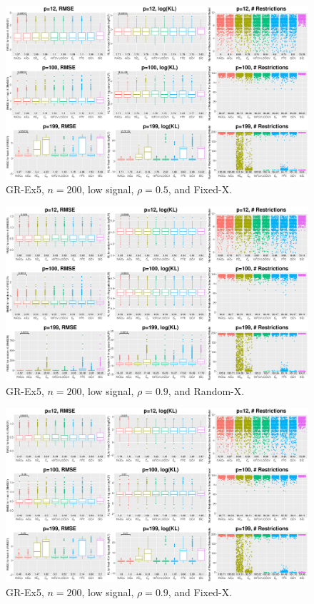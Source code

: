 \begin{figure}[!ht]
\centering
\includegraphics[width=\textwidth]{figures/supplement/fixedx_GR-Ex5_n200_lsnr_rho05.eps}
\caption{GR-Ex5, $n=200$, low signal, $\rho=0.5$, and Fixed-X.}
\end{figure}
\clearpage
\begin{figure}[!ht]
\centering
\includegraphics[width=\textwidth]{figures/supplement/randomx_GR-Ex5_n200_lsnr_rho09.eps}
\caption{GR-Ex5, $n=200$, low signal, $\rho=0.9$, and Random-X.}
\end{figure}
\begin{figure}[!ht]
\centering
\includegraphics[width=\textwidth]{figures/supplement/fixedx_GR-Ex5_n200_lsnr_rho09.eps}
\caption{GR-Ex5, $n=200$, low signal, $\rho=0.9$, and Fixed-X.}
\end{figure}

